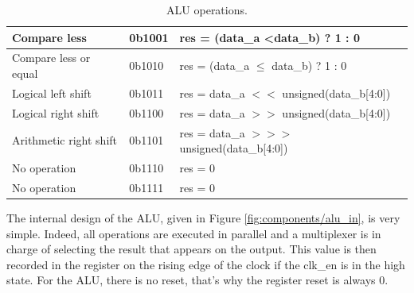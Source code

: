 \begin{table}[ht]
\begin{tabular}{|l|l|l|}
    Compare less                                                     & 0b1001                                                      & res = (data\_a \textless data\_b) ? 1 : 0                      \\ \hline
    Compare less or equal                                            & 0b1010                                                      & res = (data\_a $\leq$ data\_b) ? 1 : 0                   \\ \hline
    Logical left shift                                               & 0b1011                                                      & res = data\_a $<<$ unsigned(data\_b[4:0])                     \\ \hline
    Logical right shift                                              & 0b1100                                                      & res = data\_a $>>$ unsigned(data\_b[4:0])               \\ \hline
    Arithmetic right shift                                           & 0b1101                                                      & res = data\_a $>>>$ unsigned(data\_b[4:0]) \\ \hline
    No operation                                                     & 0b1110                                                      & res = 0                                                        \\ \hline
    No operation                                                     & 0b1111                                                      & res = 0                                                        \\ \hline
    \end{tabular}
    \caption{ALU operations.}
    \label{tab:alu/alufn}
\end{table}

The internal design of the ALU, given in Figure \ref{fig:components/alu_in}, is very 
simple. Indeed, all operations are executed in parallel and a multiplexer is in charge of 
selecting the result that appears on the output. This value is then recorded in the 
register on the rising edge of the clock if the clk\_en is in the high state. For the ALU, there is 
no reset, that's why the register reset is always 0.

